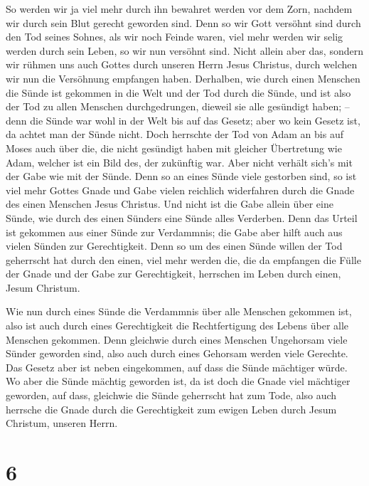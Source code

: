  So werden wir ja viel mehr durch ihn bewahret werden vor
dem Zorn, nachdem wir durch sein Blut gerecht geworden sind.
 Denn so wir Gott versöhnt sind durch den Tod seines
Sohnes, als wir noch Feinde waren, viel mehr werden wir selig werden
durch sein Leben, so wir nun versöhnt sind.  Nicht allein
aber das, sondern wir rühmen uns auch Gottes durch unseren Herrn Jesus
Christus, durch welchen wir nun die Versöhnung empfangen haben.
 Derhalben, wie durch einen Menschen die Sünde ist
gekommen in die Welt und der Tod durch die Sünde, und ist also der Tod
zu allen Menschen durchgedrungen, dieweil sie alle gesündigt haben; --
 denn die Sünde war wohl in der Welt bis auf das Gesetz;
aber wo kein Gesetz ist, da achtet man der Sünde nicht. 
Doch herrschte der Tod von Adam an bis auf Moses auch über die, die
nicht gesündigt haben mit gleicher Übertretung wie Adam, welcher ist ein
Bild des, der zukünftig war.  Aber nicht verhält sich's
mit der Gabe wie mit der Sünde. Denn so an eines Sünde viele gestorben
sind, so ist viel mehr Gottes Gnade und Gabe vielen reichlich
widerfahren durch die Gnade des einen Menschen Jesus Christus.
 Und nicht ist die Gabe allein über eine Sünde, wie durch
des einen Sünders eine Sünde alles Verderben. Denn das Urteil ist
gekommen aus einer Sünde zur Verdammnis; die Gabe aber hilft auch aus
vielen Sünden zur Gerechtigkeit.  Denn so um des einen
Sünde willen der Tod geherrscht hat durch den einen, viel mehr werden
die, die da empfangen die Fülle der Gnade und der Gabe zur
Gerechtigkeit, herrschen im Leben durch einen, Jesum Christum.

 Wie nun durch eines Sünde die Verdammnis über alle
Menschen gekommen ist, also ist auch durch eines Gerechtigkeit die
Rechtfertigung des Lebens über alle Menschen gekommen. 
Denn gleichwie durch eines Menschen Ungehorsam viele Sünder geworden
sind, also auch durch eines Gehorsam werden viele Gerechte.
 Das Gesetz aber ist neben eingekommen, auf dass die
Sünde mächtiger würde. Wo aber die Sünde mächtig geworden ist, da ist
doch die Gnade viel mächtiger geworden,  auf dass,
gleichwie die Sünde geherrscht hat zum Tode, also auch herrsche die
Gnade durch die Gerechtigkeit zum ewigen Leben durch Jesum Christum,
unseren Herrn.

\hypertarget{section-5}{%
\section{6}\label{section-5}}

